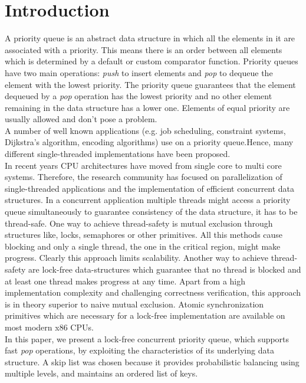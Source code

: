 \section{Introduction}\label{sec:intro}


A priority queue is an abstract data structure in which all the elements in it are associated with a priority. This means there is an order between all elements which is determined by a default or custom comparator function. Priority queues have two main operations: \textit{push} to insert elements and \textit{pop} to dequeue the element with the lowest priority. The priority queue guarantees that the element dequeued by a \textit{pop} operation has the lowest priority and no other element remaining in the data structure has a lower one. Elements of equal priority are usually allowed and don't pose a problem.\\
A number of well known applications (e.g. job scheduling, constraint systems, Dijkstra's algorithm, encoding algorithms) use on a priority queue.Hence, many different single-threaded implementations have been proposed.\\
In recent years CPU architectures have moved from single core to multi core systems. Therefore, the research community has focused on parallelization of single-threaded applications and the implementation of efficient concurrent data structures.
In a concurrent application multiple threads might access a priority queue simultaneously to guarantee consistency of the data structure, it has to be thread-safe. One way to achieve thread-safety is mutual exclusion through structures like, locks, semaphores or other primitives. All this methods cause blocking and only a single thread, the one in the critical region, might make progress. Clearly this approach limits scalability. Another way to achieve thread-safety are lock-free data-structures which guarantee that no thread is blocked and at least one thread makes progress at any time. Apart from a high implementation complexity and challenging correctness verification, this approach is in theory superior to naive mutual exclusion. Atomic synchronization primitives which are necessary for a lock-free implementation are available on most modern x86 CPUs.\\
In this paper, we present a lock-free concurrent priority queue, which supports fast \textit{pop} operations, by exploiting the characteristics of its underlying data structure. A skip list \cite{Pugh:1990:SLP:78973.78977} was chosen because it provides probabilistic balancing using multiple levels, and maintains an ordered list of keys.\\
